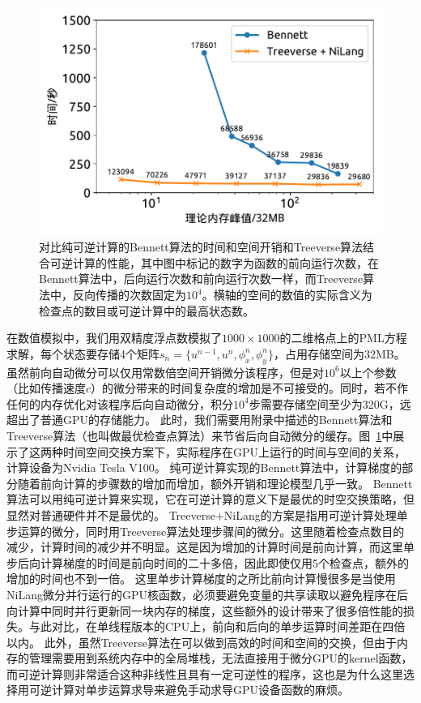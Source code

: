 \documentclass[A4,twoside,UTF8]{ctexart}
\begin{document}
\begin{figure}[t]
\centering
\includegraphics[width=0.6\columnwidth]{./fig5.pdf}
    \caption{对比纯可逆计算的Bennett算法的时间和空间开销和Treeverse算法结合可逆计算的性能，其中图中标记的数字为函数的前向运行次数，在Bennett算法中，后向运行次数和前向运行次数一样，而Treeverse算法中，反向传播的次数固定为$10^4$。横轴的空间的数值的实际含义为检查点的数目或可逆计算中的最高状态数。\label{fig:seismic}}
\end{figure}

在数值模拟中，我们用双精度浮点数模拟了$1000 \times 1000$的二维格点上的PML方程求解，每个状态要存储4个矩阵$s_n = \{u^{n-1}, u^n, \phi_x^n, \phi_y^n\}$，占用存储空间为32MB。
虽然前向自动微分可以仅用常数倍空间开销微分该程序，但是对$10^6$以上个参数（比如传播速度$c$）的微分带来的时间复杂度的增加是不可接受的。同时，若不作任何的内存优化对该程序后向自动微分，积分$10^4$步需要存储空间至少为320G，远超出了普通GPU的存储能力。
此时，我们需要用附录中描述的Bennett算法和Treeverse算法（也叫做最优检查点算法）来节省后向自动微分的缓存。图~\ref{fig:seismic}中展示了这两种时间空间交换方案下，实际程序在GPU上运行的时间与空间的关系，计算设备为Nvidia Tesla V100。
纯可逆计算实现的Bennett算法中，计算梯度的部分随着前向计算的步骤数的增加而增加，额外开销和理论模型几乎一致。
Bennett算法可以用纯可逆计算来实现，它在可逆计算的意义下是最优的时空交换策略，但显然对普通硬件并不是最优的。
Treeverse+NiLang的方案是指用可逆计算处理单步运算的微分，同时用Treeverse算法处理步骤间的微分。这里随着检查点数目的减少，计算时间的减少并不明显。这是因为增加的计算时间是前向计算，而这里单步后向计算梯度的时间是前向时间的二十多倍，因此即使仅用5个检查点，额外的增加的时间也不到一倍。
这里单步计算梯度的之所比前向计算慢很多是当使用NiLang微分并行运行的GPU核函数，必须要避免变量的共享读取以避免程序在后向计算中同时并行更新同一块内存的梯度，这些额外的设计带来了很多倍性能的损失。与此对比，在单线程版本的CPU上，前向和后向的单步运算时间差距在四倍以内。
此外，虽然Treeverse算法在可以做到高效的时间和空间的交换，但由于内存的管理需要用到系统内存中的全局堆栈，无法直接用于微分GPU的kernel函数，而可逆计算则非常适合这种非线性且具有一定可逆性的程序，这也是为什么这里选择用可逆计算对单步运算求导来避免手动求导GPU设备函数的麻烦。
\end{document}
